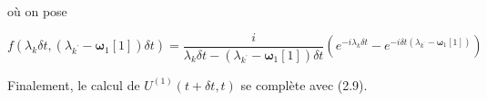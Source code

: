 où on pose

\begin{equation}
    f(\lambda_k\delta t, (\lambda_{k^\text{'}}-\boldsymbol{\omega}_1[1])\delta t) = \frac{i}{\lambda_k\delta t - (\lambda_{k^\text{'}} - \boldsymbol{\omega}_1[1])\delta t}\left(e^{-i\lambda_k\delta t} - e^{-i\delta t(\lambda_{k^\text{'}} - \boldsymbol{\omega}_1[1])} \right) 
\end{equation}

Finalement, le calcul de $U^{(1)}(t + \delta t, t)$ se complète avec (2.9).






